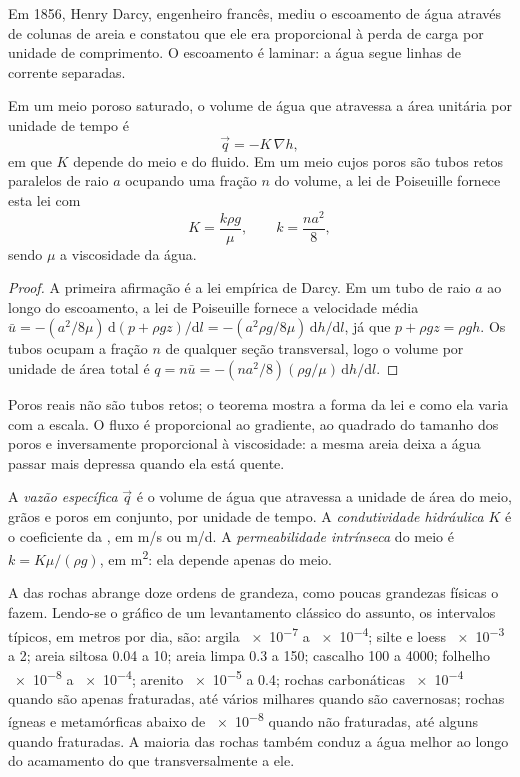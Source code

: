Em 1856, Henry Darcy, engenheiro francês, mediu o escoamento de água através de
colunas de areia e constatou que ele era proporcional à perda de carga por unidade
de comprimento. O escoamento é laminar: a água segue linhas de corrente separadas.

\begin{theorem}\label{thm:b3:hydrogeology:darcy}
Em um meio poroso saturado, o volume de água que atravessa a área unitária por
unidade de tempo é
\[
\vec q = -K\,\nabla h ,
\]
em que $K$ depende do meio e do fluido. Em um meio cujos poros
são tubos retos paralelos de raio $a$ ocupando uma fração $n$ do
volume, a lei de Poiseuille fornece esta lei com
\[
K = \frac{k\rho g}{\mu}, \qquad k = \frac{na^2}{8} ,
\]
sendo $\mu$ a viscosidade da água.
\end{theorem}

\begin{proof}
A primeira afirmação é a lei empírica de Darcy. Em um tubo de raio $a$
ao longo do escoamento, a lei de Poiseuille fornece a velocidade média $\bar u =
-(a^2/8\mu)\,\mathrm d(p + \rho gz)/\mathrm dl = -(a^2\rho g/8\mu)\,\mathrm
dh/\mathrm dl$, já que $p + \rho gz = \rho g h$. Os tubos ocupam a
fração $n$ de qualquer seção transversal, logo o volume por unidade de área total é
$q = n\bar u = -(na^2/8)(\rho g/\mu)\,\mathrm dh/\mathrm dl$.
\end{proof}

Poros reais não são tubos retos; o teorema mostra a forma da lei
e como ela varia com a escala. O fluxo é proporcional ao gradiente, ao quadrado
do tamanho dos poros e inversamente proporcional à viscosidade: a mesma areia
deixa a água passar mais depressa quando ela está quente.

\begin{definition}\label{def:b3:hydrogeology:darcy}
A \emph{vazão específica} $\vec q$ é o
volume de água que atravessa a unidade de área do meio, grãos e poros
em conjunto, por unidade de tempo. A \emph{condutividade
hidráulica} $K$ é o coeficiente da
, em \unit{m/s} ou \unit{m/d}. A \emph{permeabilidade
intrínseca} do meio é $k =
K\mu/(\rho g)$, em \unit{m^2}: ela depende apenas do meio.
\end{definition}

A  das rochas abrange doze ordens de
grandeza, como poucas grandezas físicas o fazem. Lendo-se o gráfico de um
levantamento clássico do assunto, os intervalos típicos, em metros por dia, são: argila
\num{e-7} a \num{e-4}; silte e loess \num{e-3} a 2; areia siltosa 0.04 a
10; areia limpa 0.3 a 150; cascalho 100 a 4000; folhelho \num{e-8} a
\num{e-4}; arenito \num{e-5} a 0.4; rochas carbonáticas \num{e-4} quando
são apenas fraturadas, até vários milhares quando são cavernosas; rochas ígneas e
metamórficas abaixo de \num{e-8} quando não fraturadas, até alguns quando
fraturadas. A maioria das rochas também conduz a água melhor ao longo do acamamento
do que transversalmente a ele.

